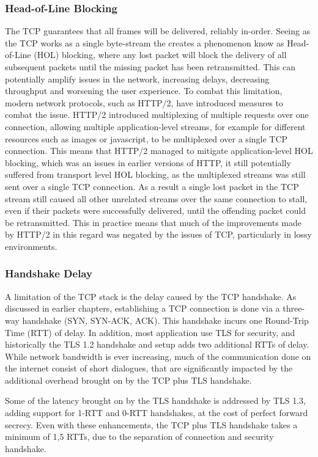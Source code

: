 \documentclass[english, 12pt, a4paper, elec, utf8, a-2b, online]{aaltothesis}
\begin{document}
\subsubsection{Head-of-Line Blocking}
The TCP guarantees that all frames will be delivered, reliably in-order. Seeing
as the TCP works as a single byte-stream the creates a phenomenon know as
Head-of-Line (HOL) blocking, where any lost packet will block the delivery of
all subsequent packets until the missing packet has been retransmitted. This
can potentially amplify issues in the network, increasing delays, decreasing
throughput and worsening the user experience. To combat this limitation, modern
network protocols, such as HTTP/2\cite{rfc9113}, have introduced measures to
combat the issue. HTTP/2 introduced multiplexing of multiple requests over one
connection, allowing multiple application-level streams, for example for different
resources such as images or javascript, to be multiplexed over a single TCP
connection. This means that HTTP/2 managed to mitigate application-level HOL
blocking, which was an issues in earlier versions of HTTP, it still potentially
suffered from transport level HOL blocking, as the multiplexed streams was still
sent over a single TCP connection. As a result a single lost packet in the TCP
stream still caused all other unrelated streams over the same connection to stall,
even if their packets were successfully delivered, until the offending packet
could be retransmitted. This in practice means that much of the improvements made
by HTTP/2 in this regard was negated by the issues of TCP, particularly in lossy
environments\cite{http2_vs_1}.

\subsubsection{Handshake Delay}
A limitation of the TCP stack is the delay caused by the TCP handshake. As discussed
in earlier chapters, establishing a TCP connection is done via a three-way handshake
(SYN, SYN-ACK, ACK). This handshake incurs one Round-Trip Time (RTT) of delay. In
addition, most application use TLS for security, and historically the TLS 1.2 handshake
and setup adds two additional RTTs of delay. While network bandwidth is ever increasing,
much of the communication done on the internet consist of short dialogues, that
are significantly impacted by the additional overhead brought on by the TCP plus TLS
handshake\cite{quic_transport_protocol_design}.

Some of the latency brought on by the TLS handshake is addressed by TLS 1.3, adding
support for 1-RTT and 0-RTT handshakes, at the cost of perfect forward secrecy\cite{rfc8446}. Even with
these enhancements, the TCP plus TLS handshake takes a minimum of 1,5 RTTs, due to the separation
of connection and security handshake.
\end{document}
